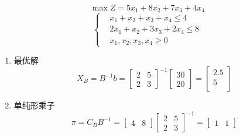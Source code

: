 \documentclass[../../main.tex]{subfiles}
\begin{document}
\begin{problem}
\begin{equation*}
    \max Z = 5x_1+8x_2+7x_3+4x_4
\end{equation*}
\begin{equation*}
    \left\{
    \begin{aligned}
         & x_1+x_2+x_3+x_4\leq 4    \\
         & 2x_1+x_2+3x_3+2x_4\leq 8 \\
         & x_1,x_2,x_3,x_4\geq 0
    \end{aligned}
    \right.
\end{equation*}
\end{problem}
\begin{solution}
    \begin{enumerate}
        \item 最优解
              \begin{equation*}
                  X_B = B^{-1}b =
                  \begin{bmatrix}
                      2 & 5 \\
                      2 & 3
                  \end{bmatrix}^{-1}
                  \begin{bmatrix}
                      30 \\
                      20
                  \end{bmatrix}
                  =
                  \begin{bmatrix}
                      2.5 \\
                      5   \\
                  \end{bmatrix}
              \end{equation*}
        \item 单纯形乘子
              \begin{equation*}
                  \pi = C_B B^{-1} =
                  \begin{bmatrix}
                      4 & 8
                  \end{bmatrix}
                  \begin{bmatrix}
                      2 & 5 \\
                      2 & 3
                  \end{bmatrix}^{-1}
                  =
                  \begin{bmatrix}
                      1 & 1
                  \end{bmatrix}

\end{equation*}
\end{enumerate}
\end{solution}
\end{document}
